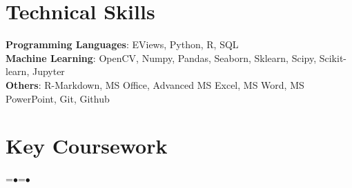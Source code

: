 \documentclass[letterpaper,11pt]{article}
\begin{document}

	\section{Technical Skills}
	\begin{itemize}[leftmargin=0.15in, label={}]
		\small{\item{
                    \textbf{Programming Languages}{: EViews, Python, R, SQL} \\
                    \textbf{Machine Learning}{: OpenCV, Numpy, Pandas, Seaborn, Sklearn, Scipy, Scikit-learn, Jupyter} \\
				\textbf{Others}{: R-Markdown, MS Office, Advanced MS Excel, MS Word, MS PowerPoint, Git, Github} \\
		}}
	\end{itemize}
	\vspace{-0.5cm}
	\section{Key Coursework}
 \vspace{-20pt}
	\newlength{\mylen}
	=\hbox{$\bullet$}=\hbox{\tiny$\bullet$}
	\setlength{\mylen}{\dimexpr0.5\ht1-0.5\ht2}
	
\end{document}
